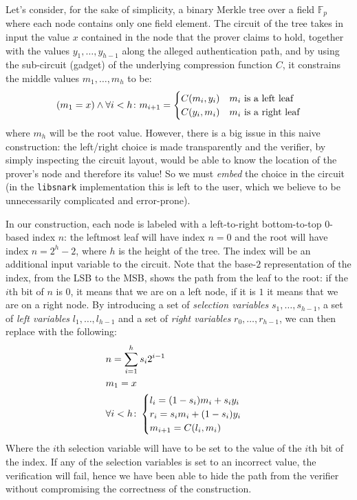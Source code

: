 Let's consider, for the sake of simplicity, a binary Merkle tree over a field \(\mathbb{F}_p\) 
where each node contains only one field element. 
The circuit of the tree takes in input the value \(x\) contained in the node that the prover claims 
to hold, together with the values \(y_1, \dots, y_{h-1}\) along the alleged authentication path, 
and by using the sub-circuit (gadget) of the underlying compression function \(C\), it constrains 
the middle values \(m_1, \dots, m_h\) to be:
\begin{equation}\label{eq:bad_constraint}
  \Parens*{m_1 = x} \land
  \forall i < h\colon m_{i+1} =
  \begin{cases}
    \call{C}{m_{i}, y_{i}} & \textnormal{\(m_{i}\) is a left leaf} \\
    \call{C}{y_{i}, m_{i}} & \textnormal{\(m_{i}\) is a right leaf}
  \end{cases}
\end{equation}
where \(m_{h}\) will be the root value. 
However, there is a big issue in this naive construction: the left/right choice is made 
transparently and the verifier, by simply inspecting the circuit layout, would be able to know 
the location of the prover's node and therefore its value!
So we must \emph{embed} the choice in the circuit (in the \texttt{libsnark} implementation this is 
left to the user, which we believe to be unnecessarily complicated and error-prone).

In our construction, each node is labeled with a left-to-right bottom-to-top \(0\)-based index 
\(n\): the leftmost leaf will have index \(n = 0\) and the root will have index \(n = 2^{h} - 2\), 
where \(h\) is the height of the tree. 
The index will be an additional input variable to the circuit. 
Note that the base-\(2\) representation of the index, from the LSB to the MSB, shows the path from 
the leaf to the root: if the \(i\)th bit of \(n\) is \(0\), it means that we are on a left node, if 
it is \(1\) it means that we are on a right node.
By introducing a set of \emph{selection variables} \(s_1, \dots, s_{h-1}\), a set of 
\emph{left variables} \(l_1, \dots, l_{h-1}\) and a set of \emph{right variables} 
\(r_0, \dots, r_{h-1}\), we can then replace  with the following:
\begin{align*}
  & n = \sum_{i=1}^{h}{s_{i}2^{i-1}} \\
  & m_1 = x \\
  & \forall i < h\colon
  \begin{cases}  
    l_i = \Parens*{1 - s_{i}}m_{i} + s_{i}y_{i} \\ 
    r_i = s_{i}m_{i} + \Parens*{1 - s_{i}}y_{i} \\
    m_{i+1} = \call{C}{l_i, m_i}
  \end{cases}
\end{align*}
Where the \(i\)th selection variable will have to be set to the value of the \(i\)th bit of the 
index. If any of the selection variables is set to an incorrect value, the verification will 
fail, hence we have been able to hide the path from the verifier without compromising the 
correctness of the construction.

